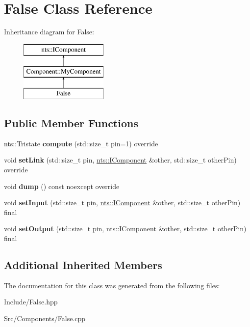 \hypertarget{classFalse}{}\section{False Class Reference}
\label{classFalse}
Inheritance diagram for False\+:\begin{figure}[H]
\begin{center}
\leavevmode
\includegraphics[height=3.000000cm]{classFalse}
\end{center}
\end{figure}
\subsection*{Public Member Functions}
\begin{DoxyCompactItemize}
\item 
\mbox{\label{classFalse_a929c783787b5a1bc14840d851e294018}} 
nts\+::\+Tristate {\bfseries compute} (std\+::size\+\_\+t pin=1) override
\item 
\mbox{\label{classFalse_adcd692fb9aa96767996f95cebec02537}} 
void {\bfseries set\+Link} (std\+::size\+\_\+t pin, \mbox{\hyperlink{classnts_1_1IComponent}{nts\+::\+I\+Component}} \&other, std\+::size\+\_\+t other\+Pin) override
\item 
\mbox{\label{classFalse_ab5fac5b173572ed8a544cc6f22b1801b}} 
void {\bfseries dump} () const noexcept override
\item 
\mbox{\label{classFalse_aaaf87a7c14cda94fc240b82ce0d7ef59}} 
void {\bfseries set\+Input} (std\+::size\+\_\+t pin, \mbox{\hyperlink{classnts_1_1IComponent}{nts\+::\+I\+Component}} \&other, std\+::size\+\_\+t other\+Pin) final
\item 
\mbox{\label{classFalse_ae3d9904440a2424999d3ad8406e54008}} 
void {\bfseries set\+Output} (std\+::size\+\_\+t pin, \mbox{\hyperlink{classnts_1_1IComponent}{nts\+::\+I\+Component}} \&other, std\+::size\+\_\+t other\+Pin) final
\end{DoxyCompactItemize}
\subsection*{Additional Inherited Members}


The documentation for this class was generated from the following files\+:\begin{DoxyCompactItemize}
\item 
Include/False.\+hpp\item 
Src/\+Components/False.\+cpp\end{DoxyCompactItemize}
